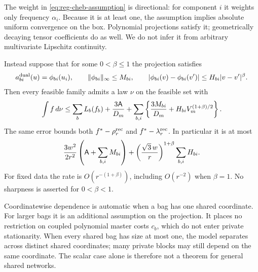The weight in \eqref{eq:reg-cheb-assumption} is directional: for
component $i$ it weights only frequency $\alpha_i$. Because it is at
least one, the assumption implies absolute uniform convergence on the
box. Polynomial projections satisfy it; geometrically decaying tensor
coefficients do as well. We do not infer it from arbitrary multivariate
Lipschitz continuity.

\begin{theorem}\label{thm:reg-holder}
Instead suppose that for some $0<\beta\le1$ the projection satisfies
\begin{equation}\label{eq:reg-holder-assumption}
 a_{bi}^{\mathrm{dual}}(u)=\phi_{bi}(u_i),\qquad
 \lVert \phi_{bi}\rVert_\infty\le M_{bi},\qquad
 \lvert \phi_{bi}(v)-\phi_{bi}(v')\rvert
                      \le H_{bi}\lvert v-v'\rvert^\beta.
\end{equation}
Then every feasible family admits a law $\nu$ on the feasible set with
\begin{equation}\label{eq:reg-holder-rounding}
 \int f\,d\nu\le\sum_bL_b(f_b)+\frac{3\mathsf{A}}{D_m}
   +\sum_{b,i}\left\{\frac{3M_{bi}}{D_m}
                   +H_{bi}V_m^{(1+\beta)/2}\right\}.
\end{equation}
The same error bounds both $f^{*}-\rho^{\mathrm{rec}}_r$ and
$f^{*}-\lambda^{\mathrm{rec}}_r$. In particular it is at most
\[
 \frac{3w^2}{2r^2}\left(\mathsf{A}+\sum_{b,i}M_{bi}\right)
 +\left(\frac{\sqrt3\,w}{r}\right)^{1+\beta}\sum_{b,i}H_{bi}.
\]
For fixed data the rate is $O(r^{-(1+\beta)})$, including $O(r^{-2})$
when $\beta=1$. No sharpness is asserted for $0<\beta<1$.
\end{theorem}

Coordinatewise dependence is automatic when a bag has one shared
coordinate. For larger bags it is an additional assumption on the
projection. It places no restriction on coupled polynomial master costs
$c_b$, which do not enter private stationarity. When every shared bag has
size at most one, the model separates across distinct shared coordinates;
many private blocks may still depend on the same coordinate. The scalar
case alone is therefore not a theorem for general shared networks.

